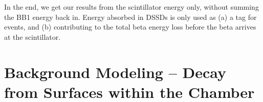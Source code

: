 In the end, we get our results from the scintillator energy only, without summing the BB1 energy back in.  Energy absorbed in DSSDs is only used as (a) a tag for events, and (b) contributing to the total beta energy loss before the beta arrives at the scintillator.




%
\section{Background Modeling -- Decay from Surfaces within the Chamber}
